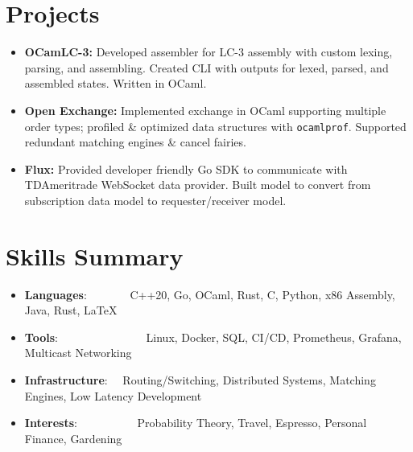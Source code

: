 \documentclass[a4paper,11pt]{extarticle}
\newcommand{\resumeSkillItem}[2]{
	\item\small{
		\textbf{#1}{: #2 \vspace{-2pt}}
	}
}
\newcommand{\resumeSubItem}[2]{\resumeSkillItem{#1}{#2}\vspace{-5pt}}
\newcommand{\resumeSubHeadingListStart}{
    \begin{itemize}[leftmargin=0.15in,label={}]}
\newcommand{\resumeSubHeadingListEnd}{\end{itemize}}
\begin{document}
\section{Projects}
    \noindent
    \begin{itemize}
        \vspace{-1.5mm}
        \item{\textbf{OCamLC-3:} Developed assembler for LC-3 assembly with
                custom lexing, parsing, and assembling. Created CLI with
                outputs for lexed, parsed, and assembled states. Written
                in OCaml.
        }
        \vspace{-1mm}
        \item{\textbf{Open Exchange:} Implemented exchange in OCaml
                supporting multiple order types; profiled \& optimized data
                structures with \texttt{ocamlprof}. Supported redundant
                matching engines \& cancel fairies.
        }
        \vspace{-1mm}
        \item{\textbf{Flux:} Provided developer friendly Go SDK to communicate
                with TDAmeritrade WebSocket data provider. Built model to
                convert from subscription data model to requester/receiver
                model. 
        }
    \end{itemize}

\section{Skills Summary}
	\resumeSubHeadingListStart
		\resumeSubItem{Languages}
            {\hspace{0.6mm}~~~~~~~C++20, Go, OCaml, Rust, C, Python, x86
                Assembly, Java, Rust, \LaTeX}
		\resumeSubItem{Tools}
            {\hspace{0.3mm}~~~~~~~~~~~~~~~Linux, Docker, SQL, CI/CD, Prometheus,
            Grafana, Multicast Networking}
		\resumeSubItem{Infrastructure}
            {~~Routing/Switching, Distributed Systems, Matching Engines, Low
            Latency Development}
        \resumeSubItem{Interests}
            {~~~~~~~~~~Probability Theory, Travel, Espresso, Personal Finance,
            Gardening}

        \begin{comment}
		\resumeSubItem{Finance}
			{\hspace{0.7mm}~~~~~~~~~~~Futures, Options, Stochastics, Hypothesis
				Testing, Commodities, Volatility}
        \end{comment}


	\resumeSubHeadingListEnd
\end{document}
